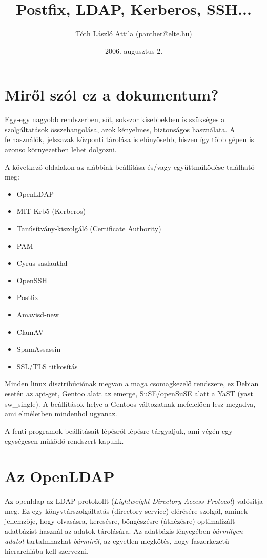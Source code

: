 \documentclass[fleqn,10pt,a4paper,titlepage]{article}
\title{Postfix, LDAP, Kerberos, SSH...}
\author{Tóth László Attila (panther@elte.hu)}
\date{2006. augusztus 2.}
\newcommand{\mktoc}{
  \pagenumbering{roman}
  \setcounter{page}{1}
  \lhead{\textbf{\thepage}}
  \cfoot{}
  \tableofcontents
  \newpage
  \lhead{\textbf{\thepage}}
  \pagenumbering{arabic}
  \setcounter{page}{1}
}
\begin{document}
  \maketitle
  \mktoc
  \newpage
  \section{Miről szól ez a dokumentum?}
  Egy-egy nagyobb rendszerben, sőt, sokszor kisebbekben is szükséges a szolgáltatások összehangolása, azok kényelmes,
  biztonságos használata. A felhasználók, jelszavak központi tárolása is előnyösebb, hiszen így több gépen is azonso
  környezetben lehet dolgozni.

  A következő oldalakon az alábbiak beállítása és/vagy együttműködése található meg:
  \begin{itemize}
  \item OpenLDAP
  \item MIT-Krb5 (Kerberos)
  \item Tanúsítvány-kiszolgáló (Certificate Authority)
  \item PAM
  \item Cyrus saslauthd
  \item OpenSSH
  \item Postfix
  \item Amavisd-new
  \item ClamAV
  \item SpamAssassin
  \item SSL/TLS titkosítás
  \end{itemize}
  
  Minden linux disztribúciónak megvan a maga csomagkezelő rendszere, ez Debian esetén az apt-get, Gentoo alatt az
  emerge, SuSE/openSuSE alatt a YaST (yast sw\_single). A beállítások helye a Gentoos változatnak mefelelően lesz
  megadva, ami elméletben mindenhol ugyanaz.

  A fenti programok beállításait lépésről lépésre tárgyaljuk, ami végén egy egységesen működő rendszert kapunk.
  
  \newpage
  \section{Az OpenLDAP}
  Az openldap az LDAP protokollt ({\em Lightweight Directory Access Protocol}) valósítja meg. Ez egy könyvtárszolgáltatás
  (directory service) elérésére szolgál, aminek jellemzője, hogy olvasásra, keresésre, böngészésre (átnézésre)
  optimalizált adatbázist használ az adatok tárolására. Az adatbázis lényegében \emph{bármilyen adatot} tartalmhazhat
  \emph{bármiről}, az egyetlen megkötés, hogy faszerkezetű hierarchiába kell szervezni.
\end{document}

